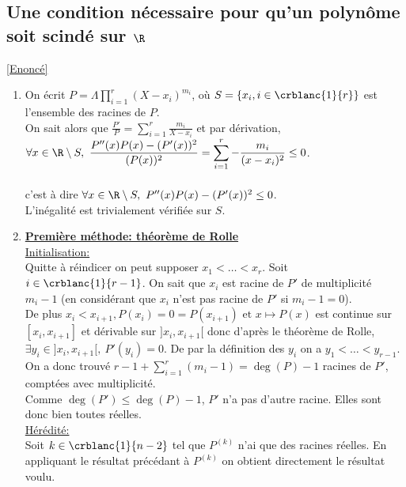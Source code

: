 \documentclass{book}
\begin{document}
	\subsection{Une condition nécessaire pour qu'un polynôme soit scindé sur $\R$ }
	\label{sec:une-condition-nécessaire-pour-qu'un-polynôme-soit-scindé-sur-R}
	\textcolor{blue}{\hyperref[Une condition nécessaire pour qu'un polynôme soit scindé sur R]{[Enoncé]}}\\
	\begin{enumerate}
		\item On écrit $P=\Lambda\displaystyle\prod\limits_{i=1}^r{(X-x_i)^{m_i}}$, où $S=\{x_i,i\in \crblanc{1}{r}\}$ est l'ensemble des racines de $P$.\\
		On sait alors que $\displaystyle\frac{P'}{P}=\displaystyle\sum\limits_{i=1}^r{\displaystyle\frac{m_i}{X-x_i}}$ et par dérivation, $\forall x\in \R\setminus S,\ \displaystyle\frac{P''(x)P(x)-(P'(x))^2}{(P(x))^2}=\displaystyle\sum\limits_{i=1}^r{-\displaystyle\frac{m_i}{(x-x_i)^2}}\leq 0$.\\\\
		c'est à dire $\forall x\in \R\setminus S,\ P''(x)P(x)-(P'(x))^2\leq 0$.\\
		L'inégalité est trivialement vérifiée sur $S$.
		\item \underline{\textbf{Première méthode: théorème de Rolle}}\\
		\underline{Initialisation:}\\
		Quitte à réindicer on peut supposer $x_1<\dots<x_r$.
		Soit $i\in \crblanc{1}{r-1}$. On sait que $x_i$ est racine de $P'$ de multiplicité $m_i-1$ (en considérant que $x_i$ n'est pas racine de $P'$ si $m_i-1=0$).\\
		De plus $x_i<x_{i+1},P(x_i)=0=P(x_{i+1}) \text{ et }x\mapsto P(x)$ est continue sur $[x_i,x_{i+1}]$ et dérivable sur $]x_i,x_{i+1}[$ donc d'après le théorème de Rolle, $\exists y_i\in ]x_i,x_{i+1}[,\ P'(y_i)=0$. De par la définition des $y_i$ on a $y_1<\dots<y_{r-1}$.\\
		On a donc trouvé $r-1+\displaystyle\sum\limits_{i=1}^r{(m_i-1)}=\deg(P)-1$ racines de $P'$, comptées avec multiplicité.\\
		Comme $\deg(P')\leq \deg(P)-1$, $P'$ n'a pas d'autre racine. Elles sont donc bien toutes réelles.\\
		\underline{Hérédité:}\\
		Soit $k\in \crblanc{1}{n-2}$ tel que $P^{(k)}$ n'ai que des racines réelles. En appliquant le résultat précédant à $P^{(k)}$ on obtient directement le résultat voulu.\\

\end{enumerate}
\end{document}
